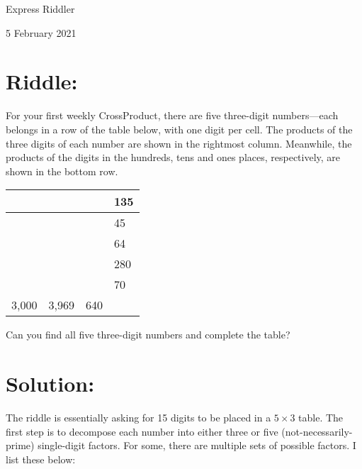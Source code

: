\documentclass{article}
\begin{document}
\pagestyle{empty} %

\begin{center}
{\LARGE Express Riddler}

\vspace{0.15in}

{\Large 5 February 2021}
\end{center}


\section*{Riddle:}

For your first weekly CrossProduct, there are five three-digit numbers---each belongs in a row of the table below, with one digit per cell.
The products of the three digits of each number are shown in the rightmost column.
Meanwhile, the products of the digits in the hundreds, tens and ones places, respectively, are shown in the bottom row.

\begin{center}
\begin{tabular}{|C{0.75in}|C{0.75in}|C{0.75in}!{\vrule width 1.5pt}R{0.75in}|}
\hline
 & & & 135 \\
\hline
 & & & 45 \\
\hline
 & & & 64 \\
\hline
 & & & 280 \\
\hline
 & & & 70 \\
3,000 & 3,969 & 640 & \\
\hline
\end{tabular}
\end{center}

Can you find all five three-digit numbers and complete the table?

\section*{Solution:}

The riddle is essentially asking for 15 digits to be placed in a $5\times3$ table.
The first step is to decompose each number into either three or five (not-necessarily-prime) single-digit factors.
For some, there are multiple sets of possible factors.
I list these below:
\end{document}

